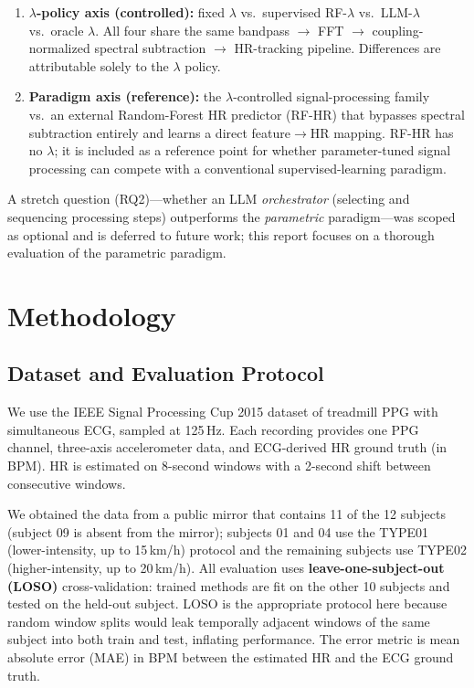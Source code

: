 \documentclass[sigconf,nonacm,11pt]{acmart}
\begin{document}
\begin{enumerate}
\item \textbf{$\lambda$-policy axis (controlled):} fixed $\lambda$ vs.\ supervised RF-$\lambda$ vs.\ LLM-$\lambda$ vs.\ oracle $\lambda$. All four share the same bandpass $\to$ FFT $\to$ coupling-normalized spectral subtraction $\to$ HR-tracking pipeline. Differences are attributable solely to the $\lambda$ policy.

\item \textbf{Paradigm axis (reference):} the $\lambda$-controlled signal-processing family vs.\ an external Random-Forest HR predictor (RF-HR) that bypasses spectral subtraction entirely and learns a direct feature$\to$HR mapping. RF-HR has no $\lambda$; it is included as a reference point for whether parameter-tuned signal processing can compete with a conventional supervised-learning paradigm.
\end{enumerate}

A stretch question (RQ2)---whether an LLM \emph{orchestrator} (selecting and sequencing processing steps) outperforms the \emph{parametric} paradigm---was scoped as optional and is deferred to future work; this report focuses on a thorough evaluation of the parametric paradigm.

\section{Methodology}

\subsection{Dataset and Evaluation Protocol}

We use the IEEE Signal Processing Cup 2015 dataset of treadmill PPG with simultaneous ECG, sampled at 125\,Hz. Each recording provides one PPG channel, three-axis accelerometer data, and ECG-derived HR ground truth (in BPM). HR is estimated on 8-second windows with a 2-second shift between consecutive windows.

We obtained the data from a public mirror that contains 11 of the 12 subjects (subject 09 is absent from the mirror); subjects 01 and 04 use the TYPE01 (lower-intensity, up to 15\,km/h) protocol and the remaining subjects use TYPE02 (higher-intensity, up to 20\,km/h). All evaluation uses \textbf{leave-one-subject-out (LOSO)} cross-validation: trained methods are fit on the other 10 subjects and tested on the held-out subject. LOSO is the appropriate protocol here because random window splits would leak temporally adjacent windows of the same subject into both train and test, inflating performance. The error metric is mean absolute error (MAE) in BPM between the estimated HR and the ECG ground truth.
\end{document}
